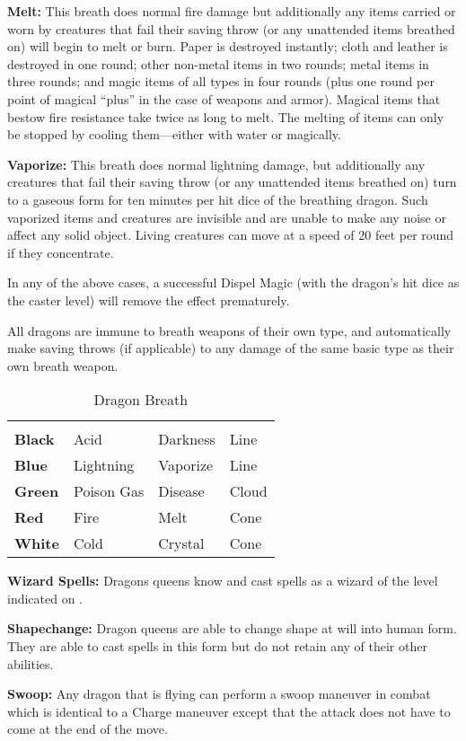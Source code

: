 \begin{multicols*}{2}
\textbf{Melt:} This breath does normal fire damage but additionally any items carried or worn by creatures that fail their saving throw (or any unattended items breathed on) will begin to melt or burn. Paper is destroyed instantly; cloth and leather is destroyed in one round; other non-metal items in two rounds; metal items in three rounds; and magic items of all types in four rounds (plus one round per point of magical “plus” in the case of weapons and armor). Magical items that bestow fire resistance take twice as long to melt. The melting of items can only be stopped by cooling them—either with water or magically.

\textbf{Vaporize:} This breath does normal lightning damage, but additionally any creatures that fail their saving throw (or any unattended items breathed on) turn to a gaseous form for ten minutes per hit dice of the breathing dragon. Such vaporized items and creatures are invisible and are unable to make any noise or affect any solid object. Living creatures can move at a speed of 20 feet per round if they concentrate.

In any of the above cases, a successful Dispel Magic (with the dragon’s hit dice as the caster level) will remove the effect prematurely.

All dragons are immune to breath weapons of their own type, and automatically make saving throws (if applicable) to any damage of the same basic type as their own breath weapon.

\begin {table}[H]
  \caption{Dragon Breath}
  \begin{tabularx}{\columnwidth}{>{\bfseries}YYYY}
	 &  &  & \\
	Black & Acid & Darkness & Line\\
	Blue & Lightning & Vaporize & Line\\
	Green & Poison Gas & Disease & Cloud\\
	Red & Fire & Melt & Cone\\
	White & Cold & Crystal & Cone
  \end {tabularx}
\end {table}

\textbf{Wizard Spells:} Dragons queens know and cast spells as a wizard of the level indicated on .

\textbf{Shapechange:} Dragon queens are able to change shape at will into human form. They are able to cast spells in this form but do not retain any of their other abilities.

\textbf{Swoop:} Any dragon that is flying can perform a swoop maneuver in combat which is identical to a Charge maneuver except that the attack does not have to come at the end of the move.

\end{multicols*}
